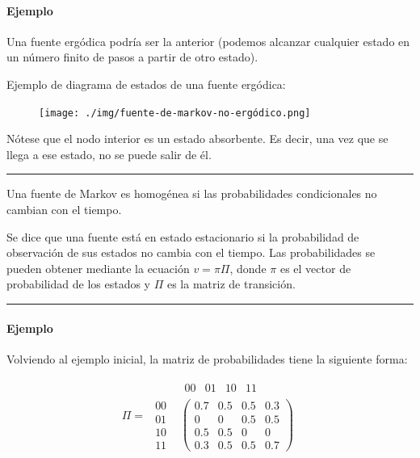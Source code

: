 \paragraph{Ejemplo}\label{ejemplo-fuentes-de-informacion}

Una fuente ergódica podría ser la anterior (podemos alcanzar cualquier
estado en un número finito de pasos a partir de otro estado).

Ejemplo de diagrama de estados de una fuente ergódica:

\begin{figure}[htbp!]
\centering
\texttt{[image: ./img/fuente-de-markov-no-ergódico.png]}
\end{figure}

Nótese que el nodo interior es un estado absorbente. Es decir, una vez
que se llega a ese estado, no se puede salir de él.

\begin{center}\rule{0.5\linewidth}{0.5pt}\end{center}

Una fuente de Markov es homogénea si las probabilidades condicionales no
cambian con el tiempo.

Se dice que una fuente está en estado estacionario si la probabilidad de
observación de sus estados no cambia con el tiempo. Las probabilidades
se pueden obtener mediante la ecuación \(v=\pi\Pi\), donde \(\pi\) es el
vector de probabilidad de los estados y \(\Pi\) es la matriz de
transición.

\begin{center}\rule{0.5\linewidth}{0.5pt}\end{center}

\paragraph{Ejemplo}\label{ejemplo-1-fuentes-de-informacion}

Volviendo al ejemplo inicial, la matriz de probabilidades tiene la
siguiente forma:

\[
\Pi = \begin{matrix}
& \begin{matrix} 00 & 01 & 10 & 11 \end{matrix} \\
\begin{matrix} 00 \\ 01 \\ 10 \\ 11 \end{matrix} & \begin{pmatrix} 0.7 & 0.5 & 0.5 & 0.3 \\ 0 & 0 & 0.5 & 0.5 \\ 0.5 & 0.5 & 0 & 0 \\ 0.3 & 0.5 & 0.5 & 0.7 \end{pmatrix}
\end{matrix}
\]

